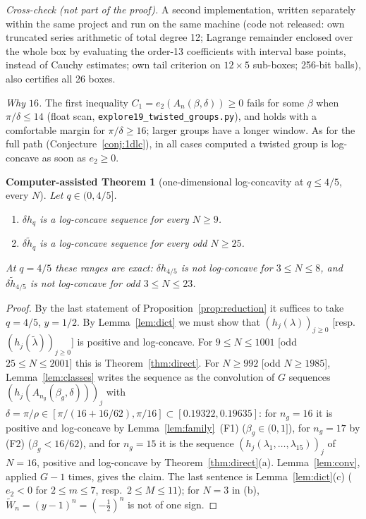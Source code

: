 \documentclass[11pt,a4paper]{article}
\newtheorem{catheorem}[theorem]{Computer-assisted Theorem}
\theoremstyle{definition}
\begin{document}
\emph{Cross-check (not part of the proof).} A second implementation, written separately within the same project and run on the same machine (code not released: own truncated series arithmetic of total degree 12; Lagrange remainder enclosed over the whole box by evaluating the order-13 coefficients with interval base points, instead of Cauchy estimates; own tail criterion on $12\times5$ sub-boxes; 256-bit balls), also certifies all 26 boxes.

\emph{Why $16$.} The first inequality $C_1=e_2(A_n(\beta,\delta))\ge0$ fails for some $\beta$ when $\pi/\delta\le14$ (float scan, \texttt{explore19\_twisted\_groups.py}), and holds with a comfortable margin for $\pi/\delta\ge16$; larger groups have a longer window. As for the full path (Conjecture~\ref{conj:1dlc}), in all cases computed a twisted group is log-concave as soon as $e_2\ge0$.

\begin{catheorem}[one-dimensional log-concavity at $q\le4/5$, every $N$]\label{thm:lc1d}
Let $q\in(0,4/5]$.
\begin{enumerate}
\item[(a)] $\delta h_q$ is a log-concave sequence for every $N\ge9$.
\item[(b)] $\delta\tilde h_q$ is a log-concave sequence for every odd $N\ge25$.
\end{enumerate}
At $q=4/5$ these ranges are exact: $\delta h_{4/5}$ is not log-concave for $3\le N\le8$, and $\delta\tilde h_{4/5}$ is not log-concave for odd $3\le N\le23$.
\end{catheorem}
\begin{proof}
By the last statement of Proposition~\ref{prop:reduction} it suffices to take $q=4/5$, $y=1/2$. By Lemma~\ref{lem:dict} we must show that $(h_j(\lambda))_{j\ge0}$ [resp.\ $(h_j(\tilde\lambda))_{j\ge0}$] is positive and log-concave. For $9\le N\le1001$ [odd $25\le N\le2001$] this is Theorem~\ref{thm:direct}. For $N\ge992$ [odd $N\ge1985$], Lemma~\ref{lem:classes} writes the sequence as the convolution of $G$ sequences $(h_j(A_{n_g}(\beta_g,\delta)))_j$ with $\delta=\pi/\rho\in[\pi/(16+16/62),\pi/16]\subset[0.19322,0.19635]$: for $n_g=16$ it is positive and log-concave by Lemma~\ref{lem:family}~(F1) ($\beta_g\in(0,1]$), for $n_g=17$ by (F2) ($\beta_g<16/62$), and for $n_g=15$ it is the sequence $(h_j(\lambda_1,\dots,\lambda_{15}))_j$ of $N=16$, positive and log-concave by Theorem~\ref{thm:direct}(a). Lemma~\ref{lem:conv}, applied $G-1$ times, gives the claim. The last sentence is Lemma~\ref{lem:dict}(c) ($e_2<0$ for $2\le m\le7$, resp.\ $2\le M\le11$); for $N=3$ in (b), $\tilde W_n=(y-1)^n=(-\frac12)^n$ is not of one sign.
\end{proof}
\end{document}
